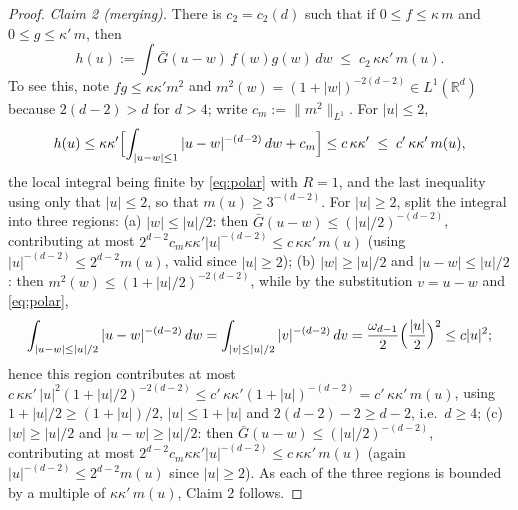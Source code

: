 \documentclass[11pt]{article}
\theoremstyle{definition}
\theoremstyle{remark}
\newcommand{\R}{\mathbb{R}}
\numberwithin{equation}{section}
\theoremstyle{plain}
\theoremstyle{definition}
\theoremstyle{remark}
\theoremstyle{plain}
\begin{document}
\begin{proof}
\emph{Claim 2 (merging).} There is $c_2=c_2(d)$ such that if
$0\le f\le\kappa\,m$ and $0\le g\le\kappa'\,m$, then
\[
h(u):=\int\bar G(u-w)\,f(w)g(w)\,dw\;\le\;c_2\,\kappa\kappa'\,m(u).
\]
To see this, note $fg\le\kappa\kappa' m^2$ and
$m^2(w)=(1+|w|)^{-2(d-2)}\in L^1(\R^d)$ because $2(d-2)>d$ for $d>4$; write
$c_m:=\|m^2\|_{L^1}$. For $|u|\le2$,
\[
h(u)\le\kappa\kappa'\Bigl[\int_{|u-w|\le1}|u-w|^{-(d-2)}\,dw
+c_m\Bigr]\le c\,\kappa\kappa'\;\le\;c'\,\kappa\kappa'\,m(u),
\]
the local integral being finite by \eqref{eq:polar} with $R=1$, and the last inequality using only that $|u|\le2$, so that $m(u)\ge3^{-(d-2)}$.
For $|u|\ge2$, split the integral into three regions:
(a) $|w|\le|u|/2$: then $\bar G(u-w)\le(|u|/2)^{-(d-2)}$, contributing
at most $2^{d-2}c_m\kappa\kappa'|u|^{-(d-2)}\le c\,\kappa\kappa'\,m(u)$ (using $|u|^{-(d-2)}\le2^{d-2}m(u)$, valid since $|u|\ge2$);
(b) $|w|\ge|u|/2$ and $|u-w|\le|u|/2$: then
$m^2(w)\le(1+|u|/2)^{-2(d-2)}$, while by the substitution $v=u-w$ and
\eqref{eq:polar},
\[
\int_{|u-w|\le|u|/2}|u-w|^{-(d-2)}\,dw
=\int_{|v|\le|u|/2}|v|^{-(d-2)}\,dv=\frac{\omega_{d-1}}{2}\Bigl(\frac{|u|}{2}\Bigr)^2
\le c|u|^2;
\]
hence this region contributes at most
$c\,\kappa\kappa'\,|u|^{2}(1+|u|/2)^{-2(d-2)}
\le c'\,\kappa\kappa'(1+|u|)^{-(d-2)}=c'\,\kappa\kappa'\,m(u)$, using $1+|u|/2\ge(1+|u|)/2$,
$|u|\le1+|u|$ and $2(d-2)-2\ge d-2$, i.e.\
$d\ge4$;
(c) $|w|\ge|u|/2$ and $|u-w|\ge|u|/2$: then
$\bar G(u-w)\le(|u|/2)^{-(d-2)}$, contributing at most
$2^{d-2}c_m\kappa\kappa'|u|^{-(d-2)}\le c\,\kappa\kappa'\,m(u)$ (again $|u|^{-(d-2)}\le2^{d-2}m(u)$ since $|u|\ge2$). As each of the three regions is bounded by a multiple of $\kappa\kappa'\,m(u)$, Claim 2 follows.


\end{proof}
\end{document}
